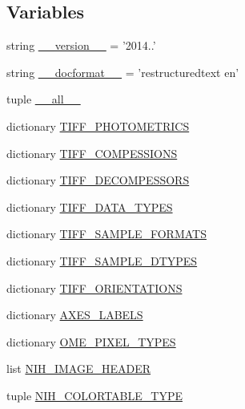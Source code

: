 \subsection*{Variables}
\begin{DoxyCompactItemize}
\item 
string \hyperlink{namespacetifffile_ade9492864cbf7aa8ab8df8ccfadcb517}{\-\_\-\-\_\-version\-\_\-\-\_\-} = '2014..'
\item 
string \hyperlink{namespacetifffile_a900bf07922924124a5d8136cf1da827b}{\-\_\-\-\_\-docformat\-\_\-\-\_\-} = 'restructuredtext en'
\item 
tuple \hyperlink{namespacetifffile_a12bf597c6d149817843e1a251fea24ac}{\-\_\-\-\_\-all\-\_\-\-\_\-}
\item 
dictionary \hyperlink{namespacetifffile_ae97a49fd3f5aa601ea643775cd7a2cc2}{T\-I\-F\-F\-\_\-\-P\-H\-O\-T\-O\-M\-E\-T\-R\-I\-C\-S}
\item 
dictionary \hyperlink{namespacetifffile_aa116c730a08b223685d7dedb1ba645a7}{T\-I\-F\-F\-\_\-\-C\-O\-M\-P\-E\-S\-S\-I\-O\-N\-S}
\item 
dictionary \hyperlink{namespacetifffile_aa40dd8260d92bb4ce1e8e23acabd17e0}{T\-I\-F\-F\-\_\-\-D\-E\-C\-O\-M\-P\-E\-S\-S\-O\-R\-S}
\item 
dictionary \hyperlink{namespacetifffile_ac5fc4c0a03f203af8324b9cfa74982fb}{T\-I\-F\-F\-\_\-\-D\-A\-T\-A\-\_\-\-T\-Y\-P\-E\-S}
\item 
dictionary \hyperlink{namespacetifffile_a9bcd5aeb8436eb2d98a761a1a6efa5b9}{T\-I\-F\-F\-\_\-\-S\-A\-M\-P\-L\-E\-\_\-\-F\-O\-R\-M\-A\-T\-S}
\item 
dictionary \hyperlink{namespacetifffile_aa50c5aae5811b01e35a37d838f782915}{T\-I\-F\-F\-\_\-\-S\-A\-M\-P\-L\-E\-\_\-\-D\-T\-Y\-P\-E\-S}
\item 
dictionary \hyperlink{namespacetifffile_a60b408f3818fcd0952e6c65de17f926e}{T\-I\-F\-F\-\_\-\-O\-R\-I\-E\-N\-T\-A\-T\-I\-O\-N\-S}
\item 
dictionary \hyperlink{namespacetifffile_af7b2944b3002574b5f1af6c83772dc87}{A\-X\-E\-S\-\_\-\-L\-A\-B\-E\-L\-S}
\item 
dictionary \hyperlink{namespacetifffile_a74bcdb69b979a5d0a0cf93df6e815ce3}{O\-M\-E\-\_\-\-P\-I\-X\-E\-L\-\_\-\-T\-Y\-P\-E\-S}
\item 
list \hyperlink{namespacetifffile_acf163877284af58b0c492c308be45006}{N\-I\-H\-\_\-\-I\-M\-A\-G\-E\-\_\-\-H\-E\-A\-D\-E\-R}
\item 
tuple \hyperlink{namespacetifffile_abe1a6d366c3be01c66a3c9e876a6eec7}{N\-I\-H\-\_\-\-C\-O\-L\-O\-R\-T\-A\-B\-L\-E\-\_\-\-T\-Y\-P\-E}

\end{DoxyCompactItemize}
